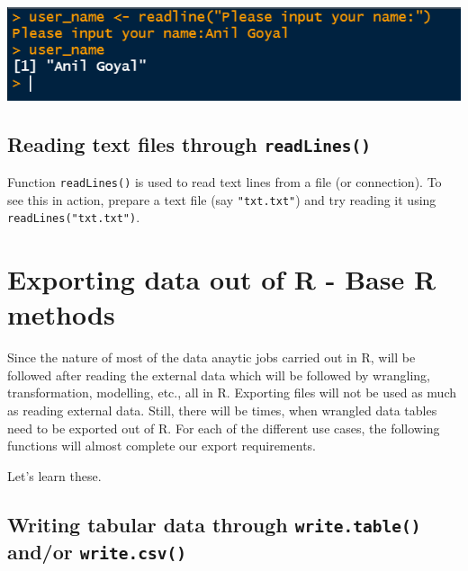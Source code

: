\documentclass[
]{book}
\begin{document}
\includegraphics{images/readline.png}

\hypertarget{reading-text-files-through-readlines}{%
\subsection*{\texorpdfstring{Reading text files through \texttt{readLines()}}{Reading text files through readLines()}}\label{reading-text-files-through-readlines}}

Function \texttt{readLines()} is used to read text lines from a file (or connection). To see this in action, prepare a text file (say \texttt{"txt.txt"}) and try reading it using \texttt{readLines("txt.txt")}.

\hypertarget{exporting-data-out-of-r---base-r-methods}{%
\section{Exporting data out of R - Base R methods}\label{exporting-data-out-of-r---base-r-methods}}

Since the nature of most of the data anaytic jobs carried out in R, will be followed after reading the external data which will be followed by wrangling, transformation, modelling, etc., all in R. Exporting files will not be used as much as reading external data. Still, there will be times, when wrangled data tables need to be exported out of R. For each of the different use cases, the following functions will almost complete our export requirements.

Let's learn these.

\hypertarget{writing-tabular-data-through-write.table-andor-write.csv}{%
\subsection*{\texorpdfstring{Writing tabular data through \texttt{write.table()} and/or \texttt{write.csv()}}{Writing tabular data through write.table() and/or write.csv()}}\label{writing-tabular-data-through-write.table-andor-write.csv}}
\end{document}
